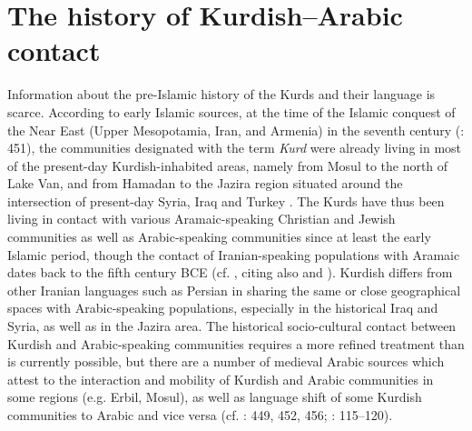\documentclass[output=paper]{langsci/langscibook}
\begin{document}
\section{The history of Kurdish–Arabic contact} 

Information about the pre-Islamic history of the Kurds and their language is scarce. According to early Islamic sources, at the time of the Islamic conquest of the Near East (Upper Mesopotamia, Iran, and Armenia) in the seventh century (\citealt{BoisEtAl2012}: 451), the communities designated with the term \textit{Kurd} were already living in most of the present-day Kurdish-inhabited areas, namely from Mosul to the north of Lake Van, and from Hamadan to the Jazira region situated around the intersection of present-day Syria, Iraq and Turkey \citep[111]{James2007}. The Kurds have thus been living in contact with various Aramaic-speaking Christian and Jewish communities as well as Arabic-speaking communities since at least the early Islamic period, though the contact of Iranian-speaking populations with Aramaic dates back to the fifth century BCE (cf. \citealt[69]{Utas2005}, citing also \citealt{Folmer1995} and \citealt{Kent1953}). Kurdish differs from other Iranian languages such as Persian in sharing the same or close geographical spaces with Arabic-speaking populations, especially in the historical Iraq and Syria, as well as in the Jazira area. The historical socio-cultural contact between Kurdish and Arabic-speaking communities requires a more refined treatment than is currently possible, but there are a number of medieval Arabic sources which attest to the interaction and mobility of Kurdish and Arabic communities in some regions (e.g. Erbil, Mosul), as well as language shift of some Kurdish communities to Arabic and vice versa (cf. \citealt{BoisEtAl2012}: 449, 452, 456; \citealt{James2007}: 115–120). 
\end{document}
